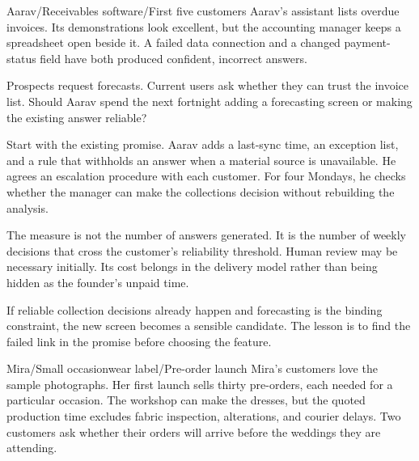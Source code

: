 \documentclass[11pt,twoside,openright]{book}
\begin{document}


  {Aarav\quad /\quad Receivables software\quad /\quad First five customers}
Aarav's assistant lists overdue invoices. Its demonstrations look excellent,
but the accounting manager keeps a spreadsheet open beside it. A failed data
connection and a changed payment-status field have both produced confident,
incorrect answers.

Prospects request forecasts. Current users ask whether they can trust the
invoice list. Should Aarav spend the next fortnight adding a forecasting screen
or making the existing answer reliable?


Start with the existing promise. Aarav adds a last-sync time, an exception list,
and a rule that withholds an answer when a material source is unavailable. He
agrees an escalation procedure with each customer. For four Mondays, he checks
whether the manager can make the collections decision without rebuilding the
analysis.

The measure is not the number of answers generated. It is the number of
weekly decisions that cross the customer's reliability threshold. Human review
may be necessary initially. Its cost belongs in the delivery model rather than
being hidden as the founder's unpaid time.

If reliable collection decisions already happen and forecasting is the binding
constraint, the new screen becomes a sensible candidate. The lesson is to find
the failed link in the promise before choosing the feature.

  {Mira\quad /\quad Small occasionwear label\quad /\quad Pre-order launch}
Mira's customers love the sample photographs. Her first launch sells thirty
pre-orders, each needed for a particular occasion. The workshop can make the
dresses, but the quoted production time excludes fabric inspection, alterations,
and courier delays. Two customers ask whether their orders will arrive before
the weddings they are attending.
\end{document}
